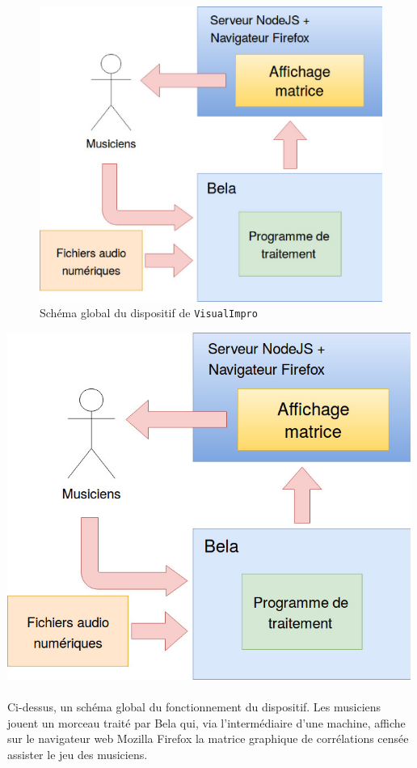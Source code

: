 \begin{figure}[h]
    \centering
    \includegraphics[scale=0.5]{schemaglobal.png}
    \caption{Schéma global du dispositif de \verb!VisualImpro!}
    \label{schéma global}
  \end{figure}
\includegraphics[scale=1]{schemaglobal.png}

\paragraph{}
Ci-dessus, un schéma global du fonctionnement du dispositif. Les
musiciens jouent un morceau traité par Bela qui, via l'intermédiaire
d'une machine, affiche sur le navigateur web Mozilla Firefox la
matrice graphique de corrélations censée assister le jeu des
musiciens.

